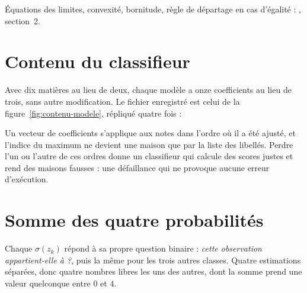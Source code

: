 \begin{approfondir}
Équations des limites, convexité, bornitude, règle de départage en cas
d'égalité : , section~2.
\end{approfondir}

\section{Contenu du classifieur}

Avec dix matières au lieu de deux, chaque modèle a onze coefficients au lieu de
trois, sans autre modification. Le fichier enregistré est celui de la
figure~\ref{fig:contenu-modele}, répliqué quatre fois :

\begin{panelitemize}
\end{panelitemize}

\begin{vigilance}
Un vecteur de coefficients s'applique aux notes dans l'ordre où il a été ajusté,
et l'indice du maximum ne devient une maison que par la liste des libellés.
Perdre l'un ou l'autre de ces ordres donne un classifieur qui calcule des scores
justes et rend des maisons fausses : une défaillance qui ne provoque aucune
erreur d'exécution.
\end{vigilance}

\section{Somme des quatre probabilités}
\label{sec:sommes}

Chaque $\sigma(z_k)$ répond à sa propre question binaire : \emph{cette
observation appartient-elle à \Gryf ?}, puis la même pour les trois autres
classes. Quatre estimations séparées, donc quatre nombres libres les uns des
autres, dont la somme prend une valeur quelconque entre $0$ et $4$.

